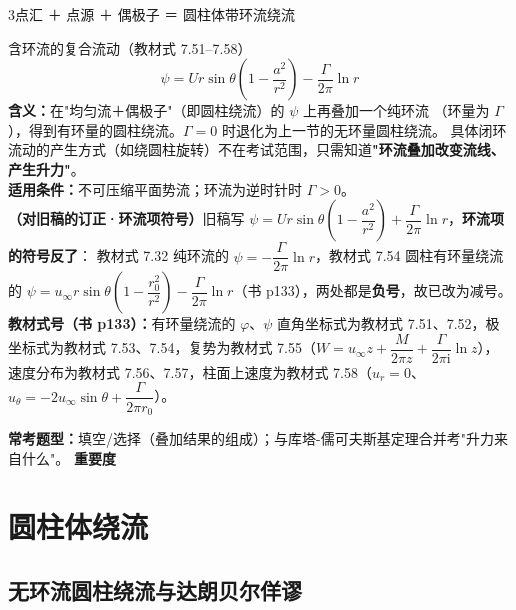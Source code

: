 \begin{kaodian}{3}{点汇 ＋ 点源 ＋ 偶极子 ＝ 圆柱体带环流绕流}
\begin{gongshi}{含环流的复合流动（教材式 7.51--7.58）}
\[ \psi=U r\sin\theta\left(1-\frac{a^2}{r^2}\right)-\frac{\Gamma}{2\pi}\ln r \]
\textbf{含义：}在"均匀流＋偶极子"（即圆柱绕流）的 $\psi$ 上再叠加一个纯环流
（环量为 $\Gamma$），得到有环量的圆柱绕流。$\Gamma=0$ 时退化为上一节的无环量圆柱绕流。
具体闭环流动的产生方式（如绕圆柱旋转）不在考试范围，只需知道\textbf{"环流叠加改变流线、产生升力"}。\\
\textbf{适用条件：}不可压缩平面势流；环流为逆时针时 $\Gamma>0$。\\
\textbf{（对旧稿的订正·环流项符号）}旧稿写 $\psi=Ur\sin\theta\left(1-\dfrac{a^2}{r^2}\right)+\dfrac{\Gamma}{2\pi}\ln r$，\textbf{环流项的符号反了}：
教材式 7.32 纯环流的 $\psi=-\dfrac{\Gamma}{2\pi}\ln r$，教材式 7.54 圆柱有环量绕流的
$\psi=u_\infty r\sin\theta\left(1-\dfrac{r_0^2}{r^2}\right)-\dfrac{\Gamma}{2\pi}\ln r$（书 p133），两处都是\textbf{负号}，故已改为减号。\\
\textbf{教材式号（书 p133）：}有环量绕流的 $\varphi$、$\psi$ 直角坐标式为教材式 7.51、7.52，极坐标式为教材式 7.53、7.54，复势为教材式 7.55（$W=u_\infty z+\dfrac{M}{2\pi z}+\dfrac{\Gamma}{2\pi\mathrm{i}}\ln z$），速度分布为教材式 7.56、7.57，柱面上速度为教材式 7.58（$u_r=0$、$u_\theta=-2u_\infty\sin\theta+\dfrac{\Gamma}{2\pi r_0}$）。
\end{gongshi}
\textbf{常考题型：}填空/选择（叠加结果的组成）；与库塔-儒可夫斯基定理合并考"升力来自什么"。
\textbf{重要度 }\quad{}\quad{}
\end{kaodian}

\section{圆柱体绕流}

\subsection{无环流圆柱绕流与达朗贝尔佯谬}

